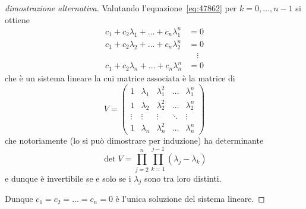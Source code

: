 \begin{proof}[dimostrazione alternativa]
Valutando l'equazione~\eqref{eq:47862} per $k=0,\dots, n-1$ si ottiene
\begin{align*}
  c_1 + c_2 \lambda_1 + \dots + c_n \lambda_1^n & = 0 \\
  c_1 + c_2 \lambda_2 + \dots + c_n \lambda_2^n & = 0 \\
  &\quad \vdots\\
  c_1 + c_2 \lambda_n + \dots + c_n \lambda_n^n & = 0
\end{align*}
che è un sistema lineare la cui matrice associata è
la matrice di 
%
\[
V =
\begin{pmatrix}
  1 & \lambda_1 & \lambda_1^2 & \dots & \lambda_1^n \\
  1 & \lambda_2 & \lambda_2^2 & \dots & \lambda_2^n \\
  \vdots & \vdots & \vdots & \ddots & \vdots \\
  1 & \lambda_n & \lambda_n^2 & \dots & \lambda_n^n
\end{pmatrix}
\]
che notoriamente (lo si può dimostrare per induzione)
ha determinante
\[
  \det V = \prod_{j=2}^{n} \prod_{k=1}^{j-1}(\lambda_j-\lambda_k)
\]
e dunque
è invertibile se e solo se
i $\lambda_j$ sono tra loro distinti.

Dunque $c_1 = c_2 = \dots = c_n = 0$ è l'unica soluzione
del sistema lineare.
\end{proof}

